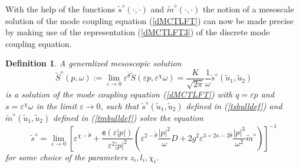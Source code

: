 \documentclass[12pt]{article}
\newtheorem{definition}[theorem]{Definition}
\begin{document}
With the help of the 
functions $\tilde{s}^{\diamond}(\cdot,\cdot)$ 
and $\tilde{m}^{\diamond}(\cdot,\cdot)$ the notion of a
mesoscale solution of the mode coupling equation (\ref{dMCTLFT})
can now be made precise by making use of the representation
(\ref{dMCTLFT3}) of the discrete mode coupling equation.

\begin{definition}
\label{Def:mesosolFLT}
A generalized mesoscopic solution 
\begin{equation}
\tilde{S}^{\diamond}(p,\omega) := \lim_{\varepsilon \to 0} \varepsilon^{\mathring{\theta}} 
\tilde{S}(\varepsilon p, \varepsilon^{\chi} \omega)
= \frac{K}{\sqrt{2\pi}} \frac{1}{\omega} \tilde{s}^{\diamond}(\tilde{u}_1,\tilde{u}_2)
\label{tSmesodef}
\end{equation}
is a solution of the mode coupling equation (\ref{dMCTLFT}) with 
$q=\varepsilon p$ and $s = \varepsilon^{\chi} \omega$ in the limit 
$ \varepsilon\to 0$, such that
$\tilde{s}^{\diamond}(\tilde{u}_1,\tilde{u}_2)$
defined in (\ref{tsbulldef}) and $\tilde{m}^{\diamond}(\tilde{u}_1,\tilde{u}_2)$
defined in (\ref{tmbulldef}) solve the equation
\begin{equation}
\tilde{s}^{\diamond} %
= \lim_{\varepsilon \to 0}  \left[\varepsilon^{\chi -\mathring{\theta}}
+ \frac{\mathsf{e}(\varepsilon |p|)}{\varepsilon^2 |p|^2}
\left(\varepsilon^{2-\mathring{\theta}} \frac{|p|^2}{\omega} D  
+ 2 g^2  \varepsilon^{3+2\kappa-2\mathring{\theta}} \frac{|p|^3}{\omega^2}
\tilde{m}^{\diamond}
\right)\right]^{-1}
\label{dMCTLFT4}
\end{equation}
for some choice of the parameters $z_i,l_i,\chi_i$.
\end{definition}
\end{document}
